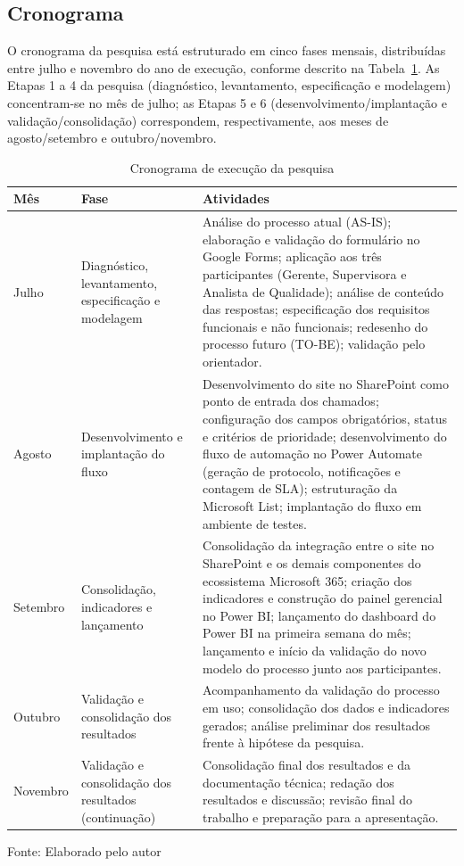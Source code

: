 \subsection{Cronograma}

O cronograma da pesquisa está estruturado em cinco fases
mensais, distribuídas entre julho e novembro do ano de
execução, conforme descrito na Tabela~\ref{tab:cronograma}.
As Etapas 1 a 4 da pesquisa (diagnóstico, levantamento,
especificação e modelagem) concentram-se no mês de julho; as
Etapas 5 e 6 (desenvolvimento/implantação e
validação/consolidação) correspondem, respectivamente, aos
meses de agosto/setembro e outubro/novembro.

\begin{table}[H]
\caption{Cronograma de execução da pesquisa}
\label{tab:cronograma}
\centering
\begin{tabular}{p{1.5cm} p{3.5cm} p{7cm}}
\hline
\textbf{Mês} & \textbf{Fase} & \textbf{Atividades} \\
\hline
Julho &
Diagnóstico, levantamento, especificação e modelagem &
Análise do processo atual (AS-IS); elaboração e validação do
formulário no Google Forms; aplicação aos três participantes
(Gerente, Supervisora e Analista de Qualidade); análise de
conteúdo das respostas; especificação dos requisitos
funcionais e não funcionais; redesenho do processo futuro
(TO-BE); validação pelo orientador. \\
\hline
Agosto &
Desenvolvimento e implantação do fluxo &
Desenvolvimento do site no SharePoint como ponto de entrada
dos chamados; configuração dos campos obrigatórios, status e
critérios de prioridade; desenvolvimento do fluxo de
automação no Power Automate (geração de protocolo,
notificações e contagem de SLA); estruturação da Microsoft
List; implantação do fluxo em ambiente de testes. \\
\hline
Setembro &
Consolidação, indicadores e lançamento &
Consolidação da integração entre o site no SharePoint e os
demais componentes do ecossistema Microsoft 365; criação dos
indicadores e construção do painel gerencial no Power BI;
lançamento do dashboard do Power BI na primeira semana do
mês; lançamento e início da validação do novo modelo do
processo junto aos participantes. \\
\hline
Outubro &
Validação e consolidação dos resultados &
Acompanhamento da validação do processo em uso; consolidação
dos dados e indicadores gerados; análise preliminar dos
resultados frente à hipótese da pesquisa. \\
\hline
Novembro &
Validação e consolidação dos resultados (continuação) &
Consolidação final dos resultados e da documentação técnica;
redação dos resultados e discussão; revisão final do trabalho
e preparação para a apresentação. \\
\hline
\end{tabular}
\raggedright
\par
{\fontsize{10}{12}\selectfont Fonte: Elaborado pelo autor}
\end{table}
